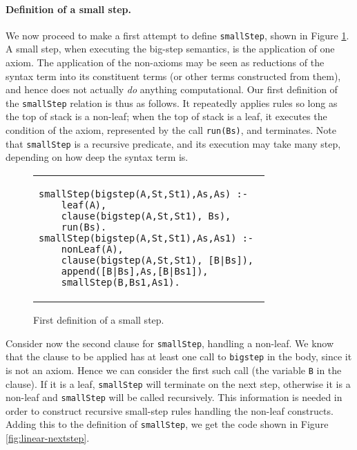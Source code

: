 \documentclass{llncs}
\begin{document}
\paragraph{Definition of a small step.} We now proceed to make a first attempt to define \texttt{smallStep}, shown in Figure \ref{fig:linear-smallstep}.
A small step, when executing the big-step semantics, is the application of one axiom.  
The application of the non-axioms may be seen as reductions of the syntax
term into its constituent terms (or other terms constructed from them), and hence does not actually \emph{do} anything computational.
Our first definition of the \texttt{smallStep} relation is thus as follows. It repeatedly applies rules so long as the top of stack is a non-leaf; when 
the top of stack is a leaf, it executes the condition of the axiom, represented by the call \texttt{run(Bs)}, and terminates.  
Note that \texttt{smallStep}
is a recursive predicate, and its execution may take many step, depending on how deep the syntax term is.

\begin{figure}
\begin{tabular}{l}
\begin{lstlisting}
smallStep(bigstep(A,St,St1),As,As) :- 
    leaf(A),
    clause(bigstep(A,St,St1), Bs),
    run(Bs).
smallStep(bigstep(A,St,St1),As,As1) :- 
    nonLeaf(A),
    clause(bigstep(A,St,St1), [B|Bs]),
    append([B|Bs],As,[B|Bs1]),
    smallStep(B,Bs1,As1).
\end{lstlisting}
\end{tabular}
\caption{First definition of a small step.}\label{fig:linear-smallstep}
\end{figure}

Consider now the second clause for \texttt{smallStep}, handling a non-leaf.  We know that the clause to be applied has at least one
call to \texttt{bigstep} in the body, since it is not an axiom. Hence we can consider the first such call (the variable \texttt{B} in the clause).
If it is a leaf, \texttt{smallStep} will terminate on the next step, otherwise it is a non-leaf and \texttt{smallStep} will be called recursively.
This information is needed in order to construct recursive small-step rules handling the non-leaf constructs. Adding this to the definition of
\texttt{smallStep}, we get the code shown in Figure \ref{fig:linear-nextstep}.
\end{document}
